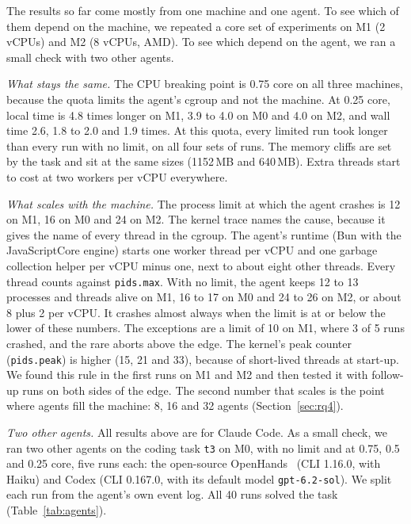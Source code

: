\documentclass[sigconf,review,anonymous]{acmart}
\begin{document}
The results so far come mostly from one machine and one agent. To see
which of them depend on the machine, we repeated a core set of
experiments on M1 (2 vCPUs) and M2 (8 vCPUs, AMD). To see which depend
on the agent, we ran a small check with two other agents.

\emph{What stays the same.} The CPU breaking point is 0.75 core on all
three machines, because the quota limits the agent's cgroup and not the
machine. At 0.25 core, local time is 4.8 times longer on M1, 3.9 to 4.0
on M0 and 4.0 on M2, and wall time 2.6, 1.8 to 2.0 and 1.9 times. At
this quota, every limited run took longer than every run with no limit,
on all four sets of runs. The memory cliffs
are set by the task and sit at the same sizes (1152\,MB and 640\,MB).
Extra threads start to cost at two workers per vCPU everywhere.

\emph{What scales with the machine.} The process limit at which the
agent crashes is 12 on M1, 16 on M0 and 24 on M2. The kernel trace names
the cause, because it gives the name of every thread in the cgroup. The
agent's runtime (Bun with the JavaScriptCore engine) starts one worker
thread per vCPU and one garbage collection helper per vCPU minus one,
next to about eight other threads. Every thread counts against
\texttt{pids.max}. With no limit, the agent keeps 12 to 13 processes and
threads alive on M1, 16 to 17 on M0 and 24 to 26 on M2, or about 8 plus
2 per vCPU. It crashes almost always when the limit is at or below the lower of
these numbers. The exceptions are a limit of 10 on M1, where 3 of 5 runs
crashed, and the rare aborts above the edge. The kernel's peak counter
(\texttt{pids.peak}) is higher (15, 21 and 33), because of short-lived
threads at start-up. We found this rule in the first runs on M1 and M2
and then tested it with follow-up runs on both sides of the edge. The
second number that scales is the point where agents fill the machine: 8,
16 and 32 agents (Section~\ref{sec:rq4}).



\emph{Two other agents.} All results above are for Claude Code. As a
small check, we ran two other agents on the coding task \texttt{t3} on
M0, with no limit and at 0.75, 0.5 and 0.25 core, five runs each: the
open-source OpenHands~\cite{wang2025} (CLI 1.16.0, with Haiku) and Codex
(CLI 0.167.0, with its default model \texttt{gpt-6.2-sol}). We split
each run from the agent's own event log. All 40 runs solved the task
(Table~\ref{tab:agents}).
\end{document}
